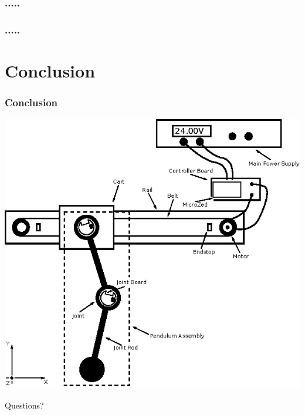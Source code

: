 \documentclass[mathserif]{beamer}
\begin{document}
\begin{frame}[c]\frametitle{.....}
    \begin{figure}[h]
		\centering
	\end{figure}
\end{frame}


\begin{frame}[c]\frametitle{.....}
    \begin{figure}[h]
		\centering
		
	\end{figure}
\end{frame}



\section{Conclusion}

\begin{frame}[t]\frametitle{Conclusion}
	\centering
	\includegraphics[scale=1.1]{graphics/system_overview}
\end{frame}

\begin{frame}[standout]
  Questions?
\end{frame}
\end{document}
